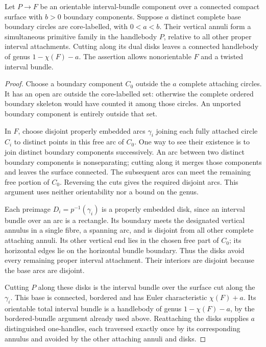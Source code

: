 \begin{proposition}
\label{marked-cut:primitive-family}
Let $P\to F$ be an orientable interval-bundle component over a connected
compact surface with $b>0$ boundary components. Suppose $a$ distinct complete
base boundary circles are core-labelled, with $0<a<b$. Their vertical annuli
form a simultaneous primitive family in the handlebody $P$, relative to all
other proper interval attachments. Cutting along its dual disks leaves a
connected handlebody of genus $1-\chi(F)-a$. The assertion allows
nonorientable $F$ and a twisted interval bundle.
\end{proposition}
\begin{proof}
Choose a boundary component $C_0$ outside the $a$ complete attaching circles.
It has an open arc outside the core-labelled set: otherwise the complete
ordered boundary skeleton would have counted it among those circles. An
unported boundary component is entirely outside that set.

In $F$, choose disjoint properly embedded arcs $\gamma_i$ joining each
fully attached circle $C_i$ to distinct points in this free arc of $C_0$.
One way to see their existence is to join distinct boundary components
successively. An arc between two distinct boundary components is
nonseparating; cutting along it merges those components and leaves the
surface connected. The subsequent arcs can meet the remaining free portion
of $C_0$. Reversing the cuts gives the required disjoint arcs. This argument
uses neither orientability nor a bound on the genus.

Each preimage $D_i=p^{-1}(\gamma_i)$ is a properly embedded disk, since an
interval bundle over an arc is a rectangle. Its boundary meets the designated
vertical annulus in a single fibre, a spanning arc, and is disjoint from
all other complete attaching annuli. Its other vertical end lies in the
chosen free part of $C_0$; its horizontal edges lie on the horizontal bundle
boundary. Thus the disks avoid every remaining proper interval attachment.
Their interiors are disjoint because the base arcs are disjoint.

Cutting $P$ along these disks is the interval bundle over the surface cut
along the $\gamma_i$. This base is connected, bordered and has Euler
characteristic $\chi(F)+a$. Its orientable total interval bundle is a
handlebody of genus $1-\chi(F)-a$, by the bordered-bundle argument already
used above. Reattaching the disks supplies $a$ distinguished one-handles,
each traversed exactly once by its corresponding annulus and avoided by
the other attaching annuli and disks.
\end{proof}


